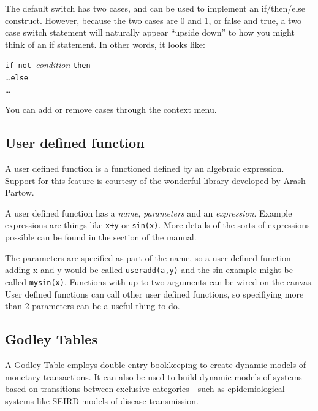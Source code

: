 The default switch has two cases, and can be used to implement an
if/then/else construct. However, because the two cases are 0 and 1,
or false and true, a two case switch statement will naturally appear
``upside down'' to how you might think of an if statement. In other
words, it looks like:

\noindent\parbox[c]{1\textwidth}{%
 \texttt{if not }{\em condition} \texttt{then}\\
 \ldots\texttt{else}\\
 \ldots %
}

You can add or remove cases through the context menu.

\subsection{User defined function}

\label{Operation:userFunction}\label{UserFunction}


A user defined function is a functioned defined by an algebraic expression.
Support for this feature is courtesy of the wonderful 
library developed by Arash Partow.

A user defined function has a {\em name}, {\em parameters} and
an {\em expression}. Example expressions are things like \verb'x+y'
or \verb'sin(x)'. More details of the sorts of expressions possible
can be found in the 
section of the manual.

The parameters are specified as part of the name, so a user defined
function adding x and y would be called \verb'useradd(a,y)' and the
sin example might be called \verb'mysin(x)'. Functions with up to
two arguments can be wired on the canvas. User defined functions can
call other user defined functions, so specifiying more than 2 parameters
can be a useful thing to do.

\subsection{Godley Tables}

\label{godley}\label{GodleyIcon}

A Godley Table employs double-entry bookkeeping to create dynamic
models of monetary transactions. It can also be used to build dynamic
models of systems based on transitions between exclusive categories---such
as epidemiological systems like SEIRD models of disease transmission.

